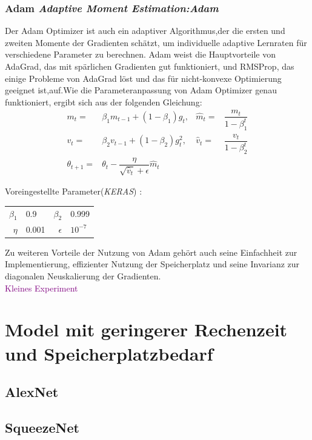 \documentclass[12pt,a4paper]{scrartcl}
\numberwithin{equation}{section}
\begin{document}
\subsubsection{Adam \textit{Adaptive Moment Estimation:Adam}}
Der Adam\cite{adam} Optimizer ist auch ein adaptiver Algorithmus,der die ersten und zweiten Momente der Gradienten schätzt, um individuelle adaptive Lernraten für verschiedene Parameter zu berechnen.
 Adam weist die Hauptvorteile von AdaGrad, das mit spärlichen Gradienten gut funktioniert, und RMSProp, das einige Probleme von AdaGrad löst und das für nicht-konvexe Optimierung geeignet ist,auf.Wie die Parameteranpassung von Adam Optimizer genau funktioniert, ergibt sich aus der folgenden Gleichung: 
\begin{equation}\label{ADAM}
		\begin{aligned}
				m_{t}=& \beta_{1}m_{t-1}+(1-\beta_{1})g_{t}, &  \widehat{m}_{t} =& \dfrac{m_{t}}{1-\beta_{1}^t}\\
				v_{t}=& \beta_{2}v_{t-1}+(1-\beta_{2})g^2_t,&\widehat{v}_{t} =&\dfrac{v_t}{1-\beta_{2}^t}\\
				\theta_{t+1} =& \theta_{t} -\dfrac{\eta}{\sqrt{\widehat{v}_{t}}+\epsilon}\widehat{m}_{t}
			\end{aligned}
\end{equation}
\begin{center}
	Voreingestellte Parameter(\textit{KERAS}) :
	\begin{tabular}{r@{: }l r@{: }l}
		 $ \beta_{1}$ & 0.9 &$ \beta_{2} $& 0.999\\
		 $ \eta$& 0.001& $ \epsilon $ & $ 10^{-7} $
	\end{tabular}
\end{center}

Zu weiteren Vorteile der Nutzung von Adam gehört auch seine Einfachheit zur Implementierung, effizienter Nutzung der Speicherplatz und seine Invarianz zur diagonalen Neuskalierung der Gradienten.
\\ \textcolor{purple}{Kleines Experiment}
 \section{Model mit geringerer Rechenzeit und Speicherplatzbedarf}
 \subsection{AlexNet}
 \subsection{SqueezeNet}
\end{document}
